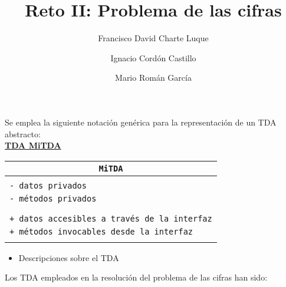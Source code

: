 \documentclass[a4paper,10pt]{scrartcl}
\title{Reto II: Problema de las cifras}
\author{Francisco David Charte Luque \and 
        Ignacio Cordón Castillo \and
        Mario Román García}
\date{}
\newcommand{\objeto}[4]{\indent\underline{\textbf{TDA #1}}
            \begin{center}\begin{tabular}{|p{7cm}|}
                 \hline
                 \multicolumn{1}{|c|}{\texttt{#1}}\\
                 \hline
                  \\#2\\\\
                 \hline
                 \\#3\\\\
                 \hline
            \end{tabular}\end{center}
            \begin{itemize}
            #4
            \end{itemize}
               }
\def\C++#1{\texttt{#1}}
\begin{document}
\maketitle

Se emplea la siguiente notación genérica para la representación 
de un TDA abstracto:\\

\objeto{MiTDA}{
		\C++{- datos privados}\\
		\C++{- métodos privados}
	}{
		\C++{+ datos accesibles a través de la interfaz}\\
		\C++{+ métodos invocables desde la interfaz}
	}{\item Descripciones sobre el TDA}

\bigskip
Los TDA empleados en la resolución del problema de las cifras han sido:\\
\end{document}
